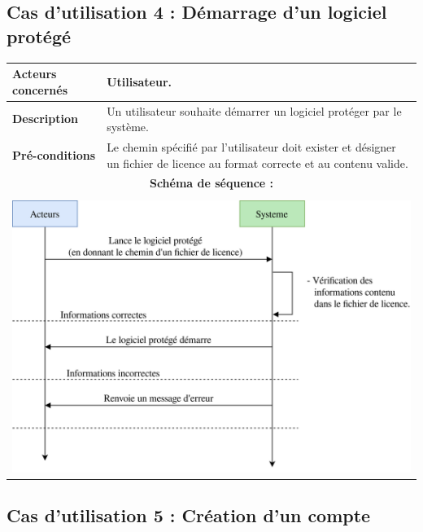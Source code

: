 \subsection{Cas d'utilisation 4 : Démarrage d'un logiciel protégé}

\begin{table}[!h]
        \centering
        \begin{tabular}{| m{4cm} | m{12cm} |}
                \hline
		    \textbf{Acteurs concernés} & Utilisateur. \\
                \hline
		    \textbf{Description} & Un utilisateur souhaite démarrer un logiciel protéger par le système. \\
                \hline
		    \textbf{Pré-conditions} & Le chemin spécifié par l'utilisateur doit exister et désigner un fichier de licence au format correcte et au contenu valide.\\
		\hline
		    \multicolumn{2}{|c|}{\textbf{Schéma de séquence :}} \\
                \hline
                    \multicolumn{2}{|c|}{}\\
                    \multicolumn{2}{|c|}{\includegraphics[width=15cm]{main/png/seq_demarrage.png}} \\
                \hline
        \end{tabular}
        \label{tab:tab4}
\end{table}
\newpage

\subsection{Cas d'utilisation 5 : Création d'un compte}


